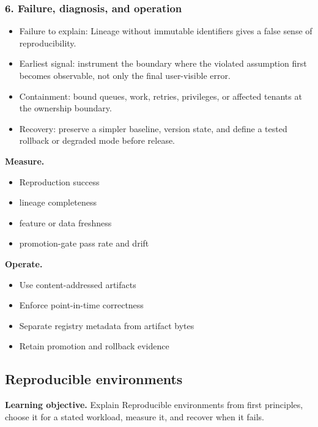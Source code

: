 \subsubsection*{6. Failure, diagnosis, and operation}
\begin{itemize}
\item Failure to explain: Lineage without immutable identifiers gives a false sense of reproducibility.
\item Earliest signal: instrument the boundary where the violated assumption first becomes observable, not only the final user-visible error.
\item Containment: bound queues, work, retries, privileges, or affected tenants at the ownership boundary.
\item Recovery: preserve a simpler baseline, version state, and define a tested rollback or degraded mode before release.
\end{itemize}
\textbf{Measure.}\begin{itemize}
\item Reproduction success
\item lineage completeness
\item feature or data freshness
\item promotion-gate pass rate and drift
\end{itemize}
\textbf{Operate.}\begin{itemize}
\item Use content-addressed artifacts
\item Enforce point-in-time correctness
\item Separate registry metadata from artifact bytes
\item Retain promotion and rollback evidence
\end{itemize}
\subsection{Reproducible environments}
\textbf{Learning objective.} Explain Reproducible environments from first principles, choose it for a stated workload, measure it, and recover when it fails.

